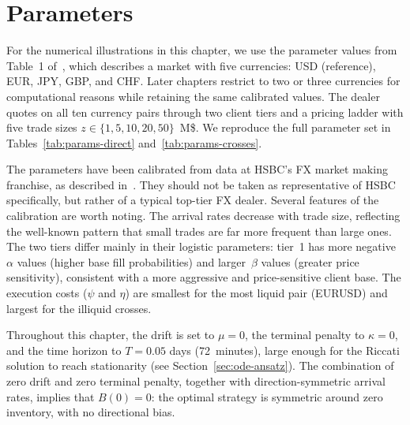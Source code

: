 \section{Parameters}
\label{sec:ode-params}

For the numerical illustrations in this chapter, we use the parameter values from Table~1 of~\cite{barzykin2023}, which describes a market with five currencies: USD (reference), EUR, JPY, GBP, and CHF. Later chapters restrict to two or three currencies for computational reasons while retaining the same calibrated values. The dealer quotes on all ten currency pairs through two client tiers and a pricing ladder with five trade sizes $z \in \{1, 5, 10, 20, 50\}$~M\$. We reproduce the full parameter set in Tables~\ref{tab:params-direct} and~\ref{tab:params-crosses}.

The parameters have been calibrated from data at HSBC's FX market making franchise, as described in~\cite{barzykin2022risk}. They should not be taken as representative of HSBC specifically, but rather of a typical top-tier FX dealer. Several features of the calibration are worth noting. The arrival rates decrease with trade size, reflecting the well-known pattern that small trades are far more frequent than large ones. The two tiers differ mainly in their logistic parameters: tier~1 has more negative~$\alpha$ values (higher base fill probabilities) and larger~$\beta$ values (greater price sensitivity), consistent with a more aggressive and price-sensitive client base. The execution costs ($\psi$ and $\eta$) are smallest for the most liquid pair (EURUSD) and largest for the illiquid crosses.

Throughout this chapter, the drift is set to $\mu = 0$, the terminal penalty to $\kappa = 0$, and the time horizon to $T = 0.05$ days (72~minutes), large enough for the Riccati solution to reach stationarity (see Section~\ref{sec:ode-ansatz}). The combination of zero drift and zero terminal penalty, together with direction-symmetric arrival rates, implies that $B(0) = 0$: the optimal strategy is symmetric around zero inventory, with no directional bias.

